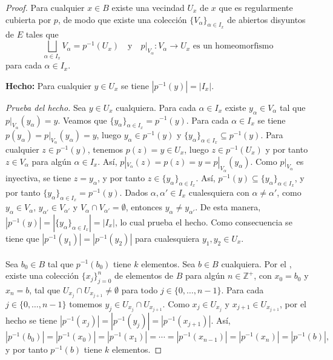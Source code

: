 \begin{proof}   
Para cualquier $x\in B$ existe una vecindad $U_x$ de $x$ que es regularmente cubierta por $p$, de modo que existe una colección $\{V_\alpha\}_{\alpha\in I_x}$ de abiertos disyuntos de $E$ tales que
\[
\bigsqcup_{\alpha\in I_x}V_\alpha=p^{-1}(U_x)
\quad\text{y}\quad
p|_{V_\alpha}:V_\alpha\to U_x \text{ es un homeomorfismo}
\]
para cada $\alpha\in I_x$.
 
\medskip
\noindent\textbf{Hecho:} Para cualquier $y\in U_x$ se tiene $|p^{-1}(y)|=|I_x|$.
 
\emph{Prueba del hecho.} Sea $y\in U_x$ cualquiera. Para cada $\alpha\in I_x$ existe $y_\alpha\in V_\alpha$ tal que $p|_{V_\alpha}(y_\alpha)=y$. Veamos que $\{y_\alpha\}_{\alpha\in I_x}=p^{-1}(y)$. Para cada $\alpha\in I_x$ se tiene $p(y_\alpha)=p|_{V_\alpha}(y_\alpha)=y$, luego $y_\alpha\in p^{-1}(y)$ y $\{y_\alpha\}_{\alpha\in I_x}\subseteq p^{-1}(y)$. Para cualquier $z\in p^{-1}(y)$, tenemos $p(z)=y\in U_x$, luego $z\in p^{-1}(U_x)$ y por tanto $z\in V_\alpha$ para algún $\alpha\in I_x$. Así, $p|_{V_\alpha}(z)=p(z)=y=p|_{V_\alpha}(y_\alpha).$ Como $p|_{V_\alpha}$ es inyectiva, se tiene $z=y_\alpha$, y por tanto $z\in\{y_\alpha\}_{\alpha\in I_x}$. Así, $p^{-1}(y)\subseteq\{y_\alpha\}_{\alpha\in I_x}$, y por tanto $\{y_\alpha\}_{\alpha\in I_x}=p^{-1}(y)$. Dados $\alpha,\alpha'\in I_x$ cualesquiera con $\alpha\neq\alpha'$, como $y_\alpha\in V_\alpha$, $y_{\alpha'}\in V_{\alpha'}$ y $V_\alpha\cap V_{\alpha'}=\emptyset$, entonces $y_\alpha\neq y_{\alpha'}$. De esta manera, $|p^{-1}(y)|=|\{y_\alpha\}_{\alpha\in I_x}|=|I_x|$, lo cual prueba el hecho. Como consecuencia se tiene que $|p^{-1}(y_1)|=|p^{-1}(y_2)|$ para cualesquiera $y_1,y_2\in U_x$.\\\\
Sea $b_0\in B$ tal que $p^{-1}(b_0)$ tiene $k$ elementos. Sea $b\in B$ cualquiera. Por el , existe una colección $\{x_j\}_{j=0}^{n}$ de elementos de $B$ para algún $n\in\mathbb{Z}^+$, con $x_0=b_0$ y $x_n=b$, tal que $U_{x_j}\cap U_{x_{j+1}}\neq\emptyset$ para todo $j\in\{0,\dots,n-1\}$. Para cada $j\in\{0,\dots,n-1\}$ tomemos $y_j\in U_{x_j}\cap U_{x_{j+1}}$. Como $x_j\in U_{x_j}$ y $x_{j+1}\in U_{x_{j+1}}$, por el hecho se tiene $|p^{-1}(x_j)|=|p^{-1}(y_j)|=|p^{-1}(x_{j+1})|.$ Así,
\[
|p^{-1}(b_0)|=|p^{-1}(x_0)|=|p^{-1}(x_1)|=\cdots=|p^{-1}(x_{n-1})|=|p^{-1}(x_n)|=|p^{-1}(b)|,
\]
y por tanto $p^{-1}(b)$ tiene $k$ elementos.
\end{proof}\clearpage
